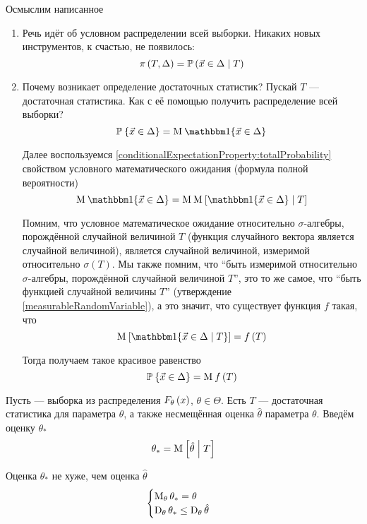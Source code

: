 Осмыслим написанное
\begin{enumerate}
  \item Речь идёт об условном распределении всей выборки.
      Никаких новых инструментов, к счастью, не появилось:
      $$\pi\left( T, \Delta \right)
      = \mathbb{P}\left( \vec{x} \in \Delta \;\middle|\; T \right)$$
  \item Почему возникает определение достаточных статистик?
      Пускай $T$ --- достаточная статистика.
      Как с её помощью получить распределение всей выборки?
      $$\Probability{\vec{x} \in \Delta}
      = \mean{\Indicator{\vec{x} \in \Delta}}$$

      Далее воспользуемся
      \ref{conditionalExpectationProperty:totalProbability}
      свойством условного математического ожидания
      (формула полной вероятности)
      $$\mean{\Indicator{\vec{x} \in \Delta}}
      = \mean{\Mean{\Indicator{\vec{x} \in \Delta} \mcond T}}$$

      Помним, что условное математическое ожидание
      относительно $\sigma$-алгебры, порождённой случайной величиной $T$
      (функция случайного вектора является случайной величиной),
      является случайной величиной, измеримой
      относительно $\sigma\left( T \right)$.
      Мы также помним, что ``быть измеримой относительно $\sigma$-алгебры,
      порождённой случайной величиной $T$'', это то же самое, что
      ``быть функцией случайной величины $T$''
      (утверждение \ref{measurableRandomVariable}), а это значит,
      что существует функция $f$ такая, что
      $$\Mean{\Indicator{\vec{x} \in \Delta \mcond T}} = f\left( T \right)$$

      Тогда получаем такое красивое равенство
      $$\mathbb{P}_{{}}\left\{ \vec{x} \in \Delta \right\} = \operatorname{M}_{} f\left( T \right)$$
\end{enumerate}

\begin{theorem}
  Пусть \xsample --- выборка из распределения $F_{\theta}\left(x\right)$,
  $\theta \in \Theta$.
  Есть $T$ --- достаточная статистика для параметра $\theta$,
  а также несмещённая оценка $\hat{\theta}$ параметра $\theta$.
  Введём оценку $\theta_*$
  $$\theta_* = \operatorname{M}_{} \left[ \hat{\theta} \;\middle|\; T \right]$$

  Оценка $\theta_*$ не хуже, чем оценка $\hat{\theta}$
  $$\begin{cases}
      \operatorname{M}_{\theta} \theta_* = \theta \\
      \operatorname{D}_{\theta} \theta_* \le \operatorname{D}_{\theta} \hat{\theta}
  \end{cases}$$
\end{theorem}

